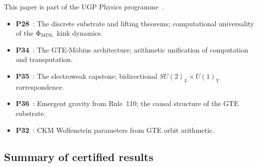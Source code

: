 \documentclass[11pt]{article}
\theoremstyle{remark}
\newcommand{\phimdl}{\Phi_{\rm MDL}}
\begin{document}
This paper is part of the UGP Physics programme~\cite{SpivackResearchProgrammes}.
\begin{itemize}[leftmargin=2em]
\item \textbf{P28}~\cite{SpivackCompUniversality}: The discrete substrate and
  lifting theorems; computational universality of the $\phimdl$ kink dynamics.
\item \textbf{P34}~\cite{SpivackGTEMobius}: The GTE-Möbius architecture;
  arithmetic unification of computation and transputation.
\item \textbf{P35}~\cite{SpivackGTEUnification}: The electroweak capstone;
  bidirectional $SU(2)_L \times U(1)_Y$ correspondence.
\item \textbf{P36}~\cite{SpivackEmergentGravity}: Emergent gravity from
  Rule~110; the causal structure of the GTE substrate.
\item \textbf{P32}~\cite{SpivackCKM}: CKM Wolfenstein parameters from GTE
  orbit arithmetic.
\end{itemize}

\subsection{Summary of certified results}
\label{ssec:summary}
\end{document}
